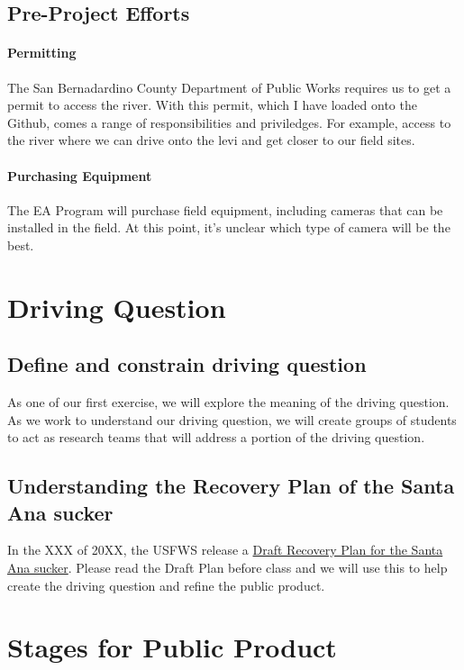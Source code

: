 \documentclass{tufte-handout}\usepackage[]{graphicx}\usepackage[]{color}
\begin{document}
\subsection{Pre-Project Efforts}

\paragraph{Permitting} The San Bernadardino County Department of Public Works requires us to get a permit to access the river. With this permit, which I have loaded onto the Github, comes a range of responsibilities and priviledges. For example, access to the river where we can drive onto the levi and get closer to our field sites. 

\paragraph{Purchasing Equipment} The EA Program will purchase field equipment, including cameras that can be installed in the field. At this point, it's unclear which type of camera will be the best.


\section{Driving Question}

\subsection{Define and constrain driving question}

As one of our first exercise, we will explore the meaning of the driving question. As we work to understand our driving question, we will create groups of students to act as research teams that will address a portion of the driving question.

\subsection{Understanding the Recovery Plan of the Santa Ana sucker}

In the XXX of 20XX, the USFWS release a \href{https://www.fws.gov/carlsbad/SpeciesStatusList/RP/201411xx_Draft%20RP_SASU.pdf}{Draft Recovery Plan for the Santa Ana sucker}. Please read the Draft Plan before class and we will use this to help create the driving question and refine the public product. 

\section{Stages for Public Product}
\end{document}
